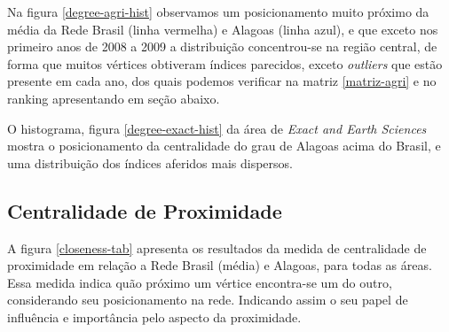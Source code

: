 Na figura \ref{degree-agri-hist} observamos um posicionamento muito próximo da média da Rede Brasil (linha vermelha) e Alagoas (linha azul), e que exceto nos primeiro anos de 2008 a 2009 a distribuição concentrou-se na região central, de forma que muitos vértices obtiveram índices parecidos, exceto \textit{outliers} que estão presente em cada ano, dos quais podemos verificar na matriz \ref{matriz-agri} e no ranking apresentando em seção abaixo.

O histograma, figura \ref{degree-exact-hist} da área de \textit{Exact and Earth Sciences} mostra o posicionamento da centralidade do grau de Alagoas acima do Brasil, e uma distribuição dos índices aferidos mais dispersos.


\subsection{\textbf{Centralidade de Proximidade}}

A figura \ref{closeness-tab} apresenta os resultados da medida de centralidade de proximidade em relação a Rede Brasil (média) e Alagoas, para todas as áreas. Essa medida indica quão próximo um vértice encontra-se um do outro, considerando seu posicionamento na rede. Indicando assim o seu papel de influência e importância pelo aspecto da proximidade.


